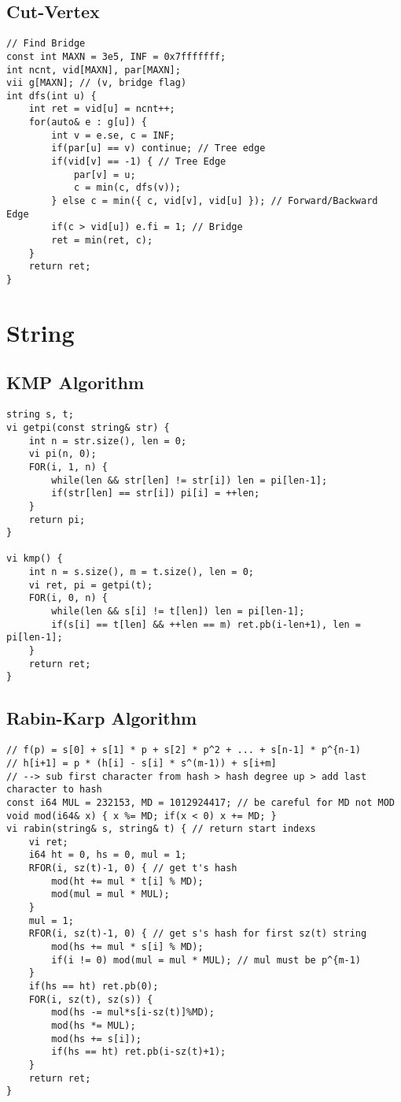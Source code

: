 \documentclass[landscape, 8pt, a4paper, oneside, twocolumn]{extarticle}
\begin{document}
\subsection {Cut-Vertex}
\begin{verbatim}
// Find Bridge
const int MAXN = 3e5, INF = 0x7fffffff;
int ncnt, vid[MAXN], par[MAXN];
vii g[MAXN]; // (v, bridge flag)
int dfs(int u) {
	int ret = vid[u] = ncnt++;
	for(auto& e : g[u]) {
		int v = e.se, c = INF;
		if(par[u] == v) continue; // Tree edge
		if(vid[v] == -1) { // Tree Edge
			par[v] = u;
			c = min(c, dfs(v));
		} else c = min({ c, vid[v], vid[u] }); // Forward/Backward Edge
		if(c > vid[u]) e.fi = 1; // Bridge
		ret = min(ret, c);
	}
	return ret;
}
\end{verbatim}
\section{String}
\subsection {KMP Algorithm}
\begin{verbatim}
string s, t;
vi getpi(const string& str) {
	int n = str.size(), len = 0;
	vi pi(n, 0);
	FOR(i, 1, n) {
		while(len && str[len] != str[i]) len = pi[len-1];
		if(str[len] == str[i]) pi[i] = ++len;
	}
	return pi;
}

vi kmp() {
	int n = s.size(), m = t.size(), len = 0;
	vi ret, pi = getpi(t);
	FOR(i, 0, n) {
		while(len && s[i] != t[len]) len = pi[len-1];
		if(s[i] == t[len] && ++len == m) ret.pb(i-len+1), len = pi[len-1];
	}
	return ret;
}
\end{verbatim}
\subsection {Rabin-Karp Algorithm}
\begin{verbatim}
// f(p) = s[0] + s[1] * p + s[2] * p^2 + ... + s[n-1] * p^{n-1)
// h[i+1] = p * (h[i] - s[i] * s^(m-1)) + s[i+m]
// --> sub first character from hash > hash degree up > add last character to hash
const i64 MUL = 232153, MD = 1012924417; // be careful for MD not MOD
void mod(i64& x) { x %= MD; if(x < 0) x += MD; }
vi rabin(string& s, string& t) { // return start indexs
	vi ret;
	i64 ht = 0, hs = 0, mul = 1;
	RFOR(i, sz(t)-1, 0) { // get t's hash
		mod(ht += mul * t[i] % MD);
		mod(mul = mul * MUL);
	}
	mul = 1;
	RFOR(i, sz(t)-1, 0) { // get s's hash for first sz(t) string
		mod(hs += mul * s[i] % MD);
		if(i != 0) mod(mul = mul * MUL); // mul must be p^{m-1)
	}
	if(hs == ht) ret.pb(0);
	FOR(i, sz(t), sz(s)) {
		mod(hs -= mul*s[i-sz(t)]%MD);
		mod(hs *= MUL);
		mod(hs += s[i]);
		if(hs == ht) ret.pb(i-sz(t)+1);
	}
	return ret;
}
\end{verbatim}
\end{document}

